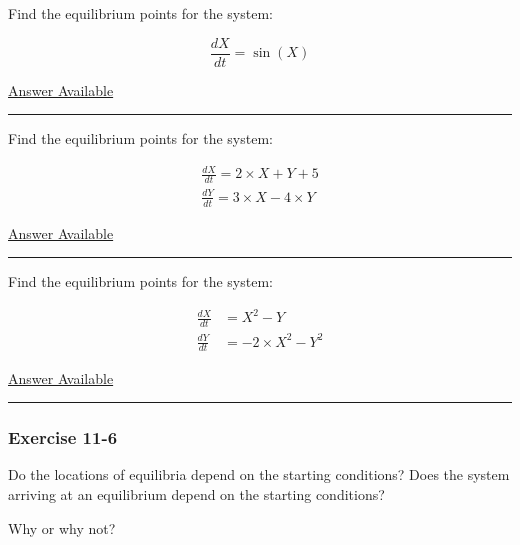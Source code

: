 \documentclass[]{memoir}
\begin{document}
Find the equilibrium points for the system:

\[ \frac{dX}{dt} = \sin(X)\]

\hyperref[Ans-11-3]{Answer Available}

\begin{center}\rule{3in}{0.4pt}\end{center}


Find the equilibrium points for the system:

\[
\begin{aligned}
\frac{dX}{dt} = 2 \times X + Y + 5\\
\frac{dY}{dt} = 3 \times X - 4 \times Y
\end{aligned}
\]

\hyperref[Ans-11-4]{Answer Available}

\begin{center}\rule{3in}{0.4pt}\end{center}


Find the equilibrium points for the system:

\[
\begin{aligned}
\frac{dX}{dt} &= X^2 - Y \\
\frac{dY}{dt} &= -2 \times X^2 - Y^2
\end{aligned}
\]

\hyperref[Ans-11-5]{Answer Available}

\begin{center}\rule{3in}{0.4pt}\end{center}

\subsubsection{Exercise 11-6}

Do the locations of equilibria depend on the starting conditions? Does
the system arriving at an equilibrium depend on the starting conditions?

Why or why not?
\end{document}
